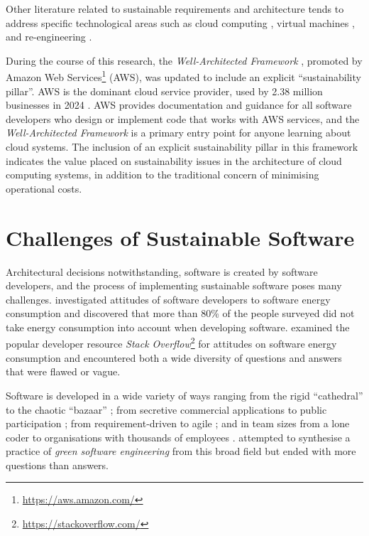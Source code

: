 Other literature related to sustainable requirements and architecture tends to address specific technological areas such as cloud computing \citep{Khomh2018} \citep{Chen2012}, virtual machines \citep{Marcu2011}, and re-engineering \citep{Jelschen2012}.

\label{A64}
During the course of this research, the \emph{Well-Architected Framework} \citep{AmazonWellArchitected}, promoted by Amazon Web Services\footnote{\url{https://aws.amazon.com/}} (AWS), was updated to include an explicit \enquote{sustainability pillar}. AWS is the dominant cloud service provider, used by 2.38 million businesses in 2024 \citep{HGInsights2024}. AWS provides documentation and guidance for all software developers who design or implement code that works with AWS services, and the \emph{Well-Architected Framework} is a primary entry point for anyone learning about cloud systems. The inclusion of an explicit sustainability pillar in this framework indicates the value placed on sustainability issues in the architecture of cloud computing systems, in addition to the traditional concern of minimising operational costs.

\section{Challenges of Sustainable Software}
\label{literature:challenges}

Architectural decisions notwithstanding, software is created by software developers, and the process of implementing sustainable software poses many challenges. \citet{Pang2016} investigated attitudes of software developers to software energy consumption and discovered that more than 80\% of the people surveyed did not take energy consumption into account when developing software. \citet{Pinto2014} examined the popular developer resource \emph{Stack Overflow}\footnote{\url{https://stackoverflow.com/}} for attitudes on software energy consumption and encountered both a wide diversity of questions and answers that were flawed or vague.

Software is developed in a wide variety of ways ranging from the rigid \enquote{cathedral} to the chaotic \enquote{bazaar} \citep{Raymond1999}; from secretive commercial applications to public participation \citep{Ballhausen2019}; from requirement-driven to agile \citep{Dick2013}; and in team sizes from a lone coder to organisations with thousands of employees \citep{Sawyer2004}. \citet{Naumann2015} attempted to synthesise a practice of \emph{green software engineering} from this broad field but ended with more questions than answers.

